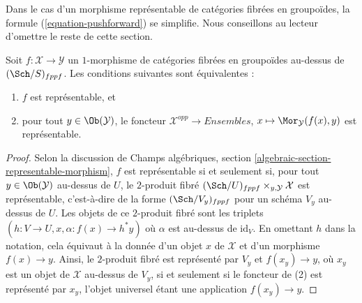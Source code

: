 \noindent
Dans le cas d'un morphisme représentable de catégories fibrées en groupoïdes,
la formule (\ref{equation-pushforward}) se simplifie. Nous conseillons au
lecteur d'omettre le reste de cette section.

\begin{lemma}
\label{lemma-representable}
Soit $f : \mathcal{X} \to \mathcal{Y}$ un $1$-morphisme de catégories
fibrées en groupoïdes au-dessus de $(\Sch/S)_{fppf}$. Les conditions suivantes sont
équivalentes :
\begin{enumerate}
\item $f$ est représentable, et
\item pour tout $y \in \Ob(\mathcal{Y})$, le foncteur
$\mathcal{X}^{opp} \to \textit{Ensembles}$,
$x \mapsto \Mor_\mathcal{Y}(f(x), y)$
est représentable.
\end{enumerate}
\end{lemma}

\begin{proof}
Selon la discussion de
Champs algébriques, section \ref{algebraic-section-representable-morphism},
$f$ est représentable si et seulement si, pour tout
$y \in \Ob(\mathcal{Y})$
au-dessus de $U$, le $2$-produit fibré
$(\Sch/U)_{fppf} \times_{y, \mathcal{Y}} \mathcal{X}$
est représentable, c'est-à-dire de la forme $(\Sch/V_y)_{fppf}$ pour un
schéma $V_y$ au-dessus de $U$. Les objets de ce $2$-produit fibré sont les triplets
$(h : V \to U, x, \alpha : f(x) \to h^*y)$ où $\alpha$ est
au-dessus de $\text{id}_V$. En omettant $h$ dans la notation, cela
équivaut à la donnée d'un objet $x$ de $\mathcal{X}$ et d'un
morphisme $f(x) \to y$. Ainsi, le $2$-produit fibré est
représenté par $V_y$ et $f(x_y) \to y$, où $x_y$ est un objet
de $\mathcal{X}$ au-dessus de $V_y$, si et seulement si le foncteur de (2) est représenté
par $x_y$, l'objet universel étant une application $f(x_y) \to y$.
\end{proof}

